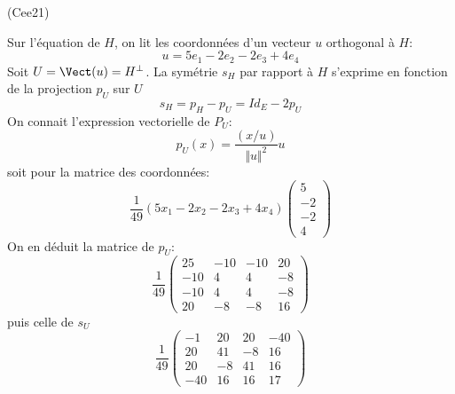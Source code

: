 \begin{tiny}(Cee21)\end{tiny} Sur l'équation de $H$, on lit les coordonnées d'un vecteur $u$ orthogonal à $H$:
\begin{displaymath}
 u = 5e_1 -2e_2 -2e_3 + 4e_4
\end{displaymath}
Soit $U = \Vect(u)=H^{\perp}$. La symétrie $s_H$ par rapport à $H$ s'exprime en fonction de la projection $p_U$ sur $U$
\begin{displaymath}
 s_H = p_{H} - p_U = Id_E - 2p_U
\end{displaymath}
 On connait l'expression vectorielle de $P_U$:
\begin{displaymath}
 p_U(x) = \frac{(x/u)}{\Vert u \Vert^2}u
\end{displaymath}
soit pour la matrice des coordonnées:
\begin{displaymath}
\frac{1}{49}(5x_1-2x_2-2x_3+4x_4)
\begin{pmatrix}
 5 \\ -2 \\ -2 \\4
\end{pmatrix} 
\end{displaymath}
On en déduit la matrice de $p_U$:
\begin{displaymath}
\frac{1}{49}
 \begin{pmatrix}
25  & -10 & -10 & 20 \\
-10 & 4   & 4   & -8  \\
-10 & 4   & 4   & -8  \\
20  & -8  & -8  & 16 
 \end{pmatrix}
\end{displaymath}
puis celle de $s_U$
\begin{displaymath}
\frac{1}{49}
 \begin{pmatrix}
-1  & 20 & 20 & -40 \\
20 & 41   & -8   & 16  \\
20 & -8   & 41   & 16  \\
-40  & 16  & 16  & 17 
 \end{pmatrix}
\end{displaymath}
